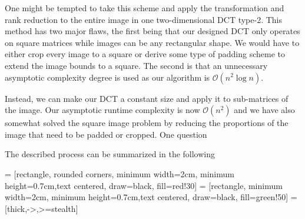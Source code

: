\documentclass[12pt,technote]{IEEEtran}
\begin{document}
One might be tempted to take this scheme and apply the transformation and rank reduction to the entire image in one two-dimensional DCT type-2. This method has two major flaws, the first being that our designed DCT only operates on square matrices while images can be any rectangular shape. We would have to either crop every image to a square or derive some type of padding scheme to extend the image bounds to a square. The second is that an unnecessary asymptotic complexity degree is used as our algorithm is $\mathcal{O}(n^2\log{n})$.

Instead, we can make our DCT a constant size and apply it to sub-matrices of the image. Our asymptotic runtime complexity is now $\mathcal{O}(n^2)$ and we have also somewhat solved the square image problem by reducing the proportions of the image that need to be padded or cropped. One question

The described process can be summarized in the following

 = [rectangle, rounded corners, minimum width=2cm, minimum height=0.7cm,text centered, draw=black, fill=red!30]
 = [rectangle, minimum width=2cm, minimum height=0.7cm,text centered, draw=black, fill=green!50]
 = [thick,->,>=stealth]
\end{document}
